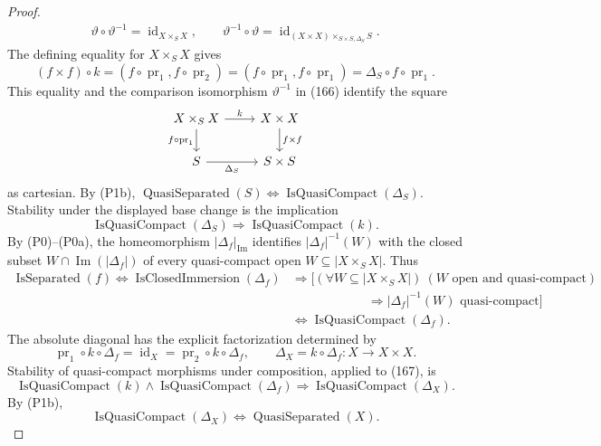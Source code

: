 \begin{proof}
\[\begin{gathered}
    \vartheta\circ\vartheta^{-1}=\operatorname{id}_{X\times_SX},
    \qquad
    \vartheta^{-1}\circ\vartheta
      =\operatorname{id}_{(X\times X)\times_{S\times S,\Delta_S}S}.
  \end{gathered}                                                   \tag{166}
  \]
  The defining equality for $X\times_SX$ gives
  \[
    (f\times f)\circ k
      =(f\circ\operatorname{pr}_1,f\circ\operatorname{pr}_2)
      =(f\circ\operatorname{pr}_1,f\circ\operatorname{pr}_1)
      =\Delta_S\circ f\circ\operatorname{pr}_1.
  \]
  This equality and the comparison isomorphism
  $\vartheta^{-1}$ in (166) identify the square
  \[
  \begin{tikzcd}
    X\times_SX \arrow[r,"k"]
      \arrow[d,"f\circ\operatorname{pr}_1"'] &
      X\times X \arrow[d,"f\times f"] \\
    S \arrow[r,"\Delta_S"'] & S\times S
  \end{tikzcd}
  \]
  as cartesian.
  By (P1b),
  \(\operatorname{QuasiSeparated}(S)
    \Longleftrightarrow\operatorname{IsQuasiCompact}(\Delta_S)\).
  Stability under the displayed base change is the implication
  \[
    \operatorname{IsQuasiCompact}(\Delta_S)
      \Longrightarrow\operatorname{IsQuasiCompact}(k).             \tag{166a}
  \]
  By (P0)--(P0a), the homeomorphism
  \(|\Delta_f|_{\operatorname{Im}}\) identifies
  \(|\Delta_f|^{-1}(W)\) with the closed subset
  \(W\cap\operatorname{Im}(|\Delta_f|)\) of every quasi-compact open
  \(W\subseteq|X\times_SX|\).  Thus
  \[
  \begin{aligned}
    \operatorname{IsSeparated}(f)
      \Longleftrightarrow\operatorname{IsClosedImmersion}(\Delta_f)
      &\Longrightarrow
      \bigl[(\forall W\subseteq|X\times_SX|)\
        (W\text{ open and quasi-compact})\\
      &\hspace{6em}\Longrightarrow
        |\Delta_f|^{-1}(W)\text{ quasi-compact}\bigr]\\
      &\Longleftrightarrow\operatorname{IsQuasiCompact}(\Delta_f).
  \end{aligned}                                                     \tag{166b}
  \]
  The absolute diagonal has the explicit factorization determined by
  \[
    \operatorname{pr}_1\circ k\circ\Delta_f
      =\operatorname{id}_X
      =\operatorname{pr}_2\circ k\circ\Delta_f,
    \qquad
    \Delta_X=k\circ\Delta_f\colon X\longrightarrow X\times X.   \tag{167}
  \]
  Stability of quasi-compact morphisms under composition, applied to (167),
  is
  \[
    \operatorname{IsQuasiCompact}(k)
      \wedge\operatorname{IsQuasiCompact}(\Delta_f)
      \Longrightarrow\operatorname{IsQuasiCompact}(\Delta_X).
  \]
  By (P1b),
  \[
    \operatorname{IsQuasiCompact}(\Delta_X)
      \Longleftrightarrow\operatorname{QuasiSeparated}(X).
  \]
\end{proof}

